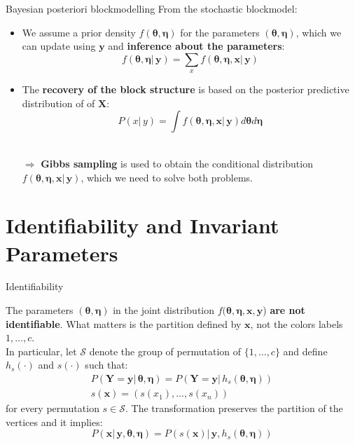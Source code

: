 \documentclass[aspectratio=169,xcolor=dvipsnames]{beamer}
\newcommand{\vecx}{\textbf{x}}
\newcommand{\vecy}{\textbf{y}}
\newcommand{\matx}{\textbf{X}}
\newcommand{\maty}{\textbf{Y}}
\newcommand{\veceta}{\boldsymbol{\eta}}
\newcommand{\vectheta}{\boldsymbol{\theta}}
\begin{document}
\begin{frame}{Bayesian posteriori blockmodelling}
From the stochastic blockmodel:

\begin{itemize}
    \item We assume a prior density $f(\vectheta,\veceta)$ for the parameters $(\vectheta,\veceta)$, which we can update using $\vecy$ and \textbf{inference about the parameters}:
    $$
    f(\vectheta,\veceta| \, \vecy) = \sum_{x} f(\vectheta,\veceta, \vecx| \, \vecy)
    $$
    \item The \textbf{recovery of the block structure} is based on the posterior predictive distribution of of $\matx$:
    $$
    P(x| \, y) = \int  f(\vectheta,\veceta, \vecx| \, \vecy) d\vectheta d\veceta
    $$\\
    
    \item[$\Longrightarrow$] \textbf{Gibbs sampling} is used to obtain the conditional distribution $f(\vectheta,\veceta, \vecx| \, \vecy)$, which we need to solve both problems.
 \end{itemize}

\end{frame}
\section{Identifiability and Invariant Parameters}
\begin{frame}{Identifiability}

The parameters $(\vectheta, \veceta)$ in the joint distribution $f(\vectheta, \veceta, \vecx, \vecy$) \textbf{are not identifiable}. What matters is the partition defined by $\vecx$, not the colors labels $1, \dots, c$. \\

\vspace{10pt}
In particular, let $\mathcal{S}$ denote the group of permutation of $\{1, \dots ,c\}$ and define $h_s(\cdot)$ and $s(\cdot)$ such that:
    \begin{gather*}
       P(\maty =\vecy | \, \vectheta, \veceta ) = P(\maty =\vecy | \, h_s(\vectheta, \veceta) )\\
       s(\vecx) = ( s(x_1), \dots, s(x_n))
    \end{gather*}
    for every permutation $s \in \mathcal{S}$.  The transformation preserves the partition of the vertices and it implies:
    $$
    P(\vecx | \, \vecy, \vectheta, \veceta) = P(s(\vecx) | \, \vecy, h_s(\vectheta, \veceta))
    $$

\end{frame}
\end{document}

